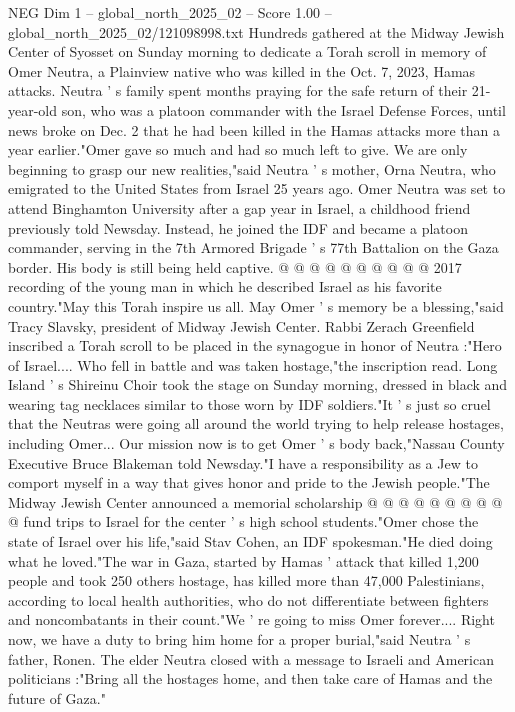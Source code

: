 \begin{textsample}{NEG Dim 1 – global\_north\_2025\_02 – Score 1.00 – global\_north\_2025\_02/121098998.txt}  \label{ex:f1_neg_010}
Hundreds gathered at the Midway Jewish Center of Syosset on Sunday morning to dedicate a Torah scroll in memory of Omer Neutra, a Plainview native who was killed in the Oct. 7, 2023, Hamas attacks.
Neutra ' s family spent months praying for the safe return of their 21-year-old son, who was a platoon commander with the Israel Defense Forces, until news broke on Dec. 2 that he had been killed in the Hamas attacks more than a year earlier."Omer gave so much and had so much left to give.
We are only beginning to grasp our new realities,"said Neutra ' s mother, Orna Neutra, who emigrated to the United States from Israel 25 years ago.
Omer Neutra was set to attend Binghamton University after a gap year in Israel, a childhood friend previously told Newsday.
Instead, he joined the IDF and became a platoon commander, serving in the 7th Armored Brigade ' s 77th Battalion on the Gaza border.
His body is still being held captive. @ @ @ @ @ @ @ @ @ @ 2017 recording of the young man in which he described Israel as his favorite country."May this Torah inspire us all.
May Omer ' s memory be a blessing,"said Tracy Slavsky, president of Midway Jewish Center.
Rabbi Zerach Greenfield inscribed a Torah scroll to be placed in the synagogue in honor of Neutra :"Hero of Israel....
Who fell in battle and was taken hostage,"the inscription read.
Long Island ' s Shireinu Choir took the stage on Sunday morning, dressed in black and wearing tag necklaces similar to those worn by IDF soldiers."It ' s just so cruel that the Neutras were going all around the world trying to help release hostages, including Omer...
Our mission now is to get Omer ' s body back,"Nassau County Executive Bruce Blakeman told Newsday."I have a responsibility as a Jew to comport myself in a way that gives honor and pride to the Jewish people."The Midway Jewish Center announced a memorial scholarship @ @ @ @ @ @ @ @ @ @ fund trips to Israel for the center ' s high school students."Omer chose the state of Israel over his life,"said Stav Cohen, an IDF spokesman."He died doing what he loved."The war in Gaza, started by Hamas ' attack that killed 1,200 people and took 250 others hostage, has killed more than 47,000 Palestinians, according to local health authorities, who do not differentiate between fighters and noncombatants in their count."We ' re going to miss Omer forever....
Right now, we have a duty to bring him home for a proper burial,"said Neutra ' s father, Ronen.
The elder Neutra closed with a message to Israeli and American politicians :"Bring all the hostages home, and then take care of Hamas and the future of Gaza."

\end{textsample}
